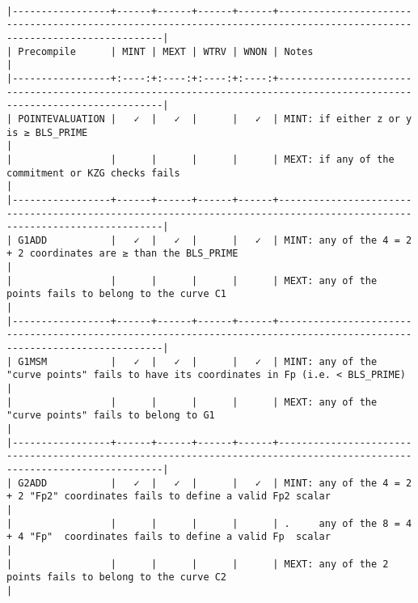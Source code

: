 \documentclass[varwidth=\maxdimen,margin=0.5cm,multi={verbatim}]{standalone}
\begin{document}
\begin{verbatim}

|-----------------+------+------+------+------+------------------------------------------------------------------------------------------------------------------------|
| Precompile      | MINT | MEXT | WTRV | WNON | Notes                                                                                                                  |
|-----------------+:----:+:----:+:----:+:----:+------------------------------------------------------------------------------------------------------------------------|
| POINTEVALUATION |   ✓  |   ✓  |      |   ✓  | MINT: if either z or y is ≥ BLS_PRIME                                                                                  |
|                 |      |      |      |      | MEXT: if any of the commitment or KZG checks fails                                                                     |
|-----------------+------+------+------+------+------------------------------------------------------------------------------------------------------------------------|
| G1ADD           |   ✓  |   ✓  |      |   ✓  | MINT: any of the 4 = 2 + 2 coordinates are ≥ than the BLS_PRIME                                                        |
|                 |      |      |      |      | MEXT: any of the points fails to belong to the curve C1                                                                |
|-----------------+------+------+------+------+------------------------------------------------------------------------------------------------------------------------|
| G1MSM           |   ✓  |   ✓  |      |   ✓  | MINT: any of the "curve points" fails to have its coordinates in Fp (i.e. < BLS_PRIME)                                 |
|                 |      |      |      |      | MEXT: any of the "curve points" fails to belong to G1                                                                  |
|-----------------+------+------+------+------+------------------------------------------------------------------------------------------------------------------------|
| G2ADD           |   ✓  |   ✓  |      |   ✓  | MINT: any of the 4 = 2 + 2 "Fp2" coordinates fails to define a valid Fp2 scalar                                        |
|                 |      |      |      |      | .     any of the 8 = 4 + 4 "Fp"  coordinates fails to define a valid Fp  scalar                                        |
|                 |      |      |      |      | MEXT: any of the 2 points fails to belong to the curve C2                                                              |

\end{verbatim}
\end{document}
